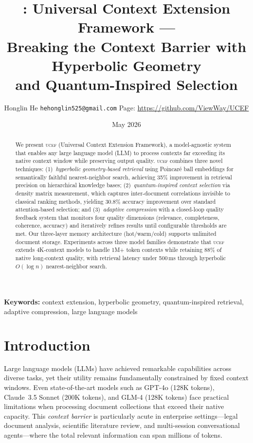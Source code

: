 \documentclass[11pt,letterpaper]{article}
\title{%
    \ucef: Universal Context Extension Framework ---\\
    Breaking the Context Barrier with Hyperbolic Geometry\\
    and Quantum-Inspired Selection%
}
\author{%
    Honglin He%
    \texttt{hehonglin525@gmail.com}
    \Project Page: \url{https://github.com/ViewWay/UCEF}
}
\date{May 2026}
\newcommand{\ucef}{\textsc{ucef}}
\begin{document}
\maketitle

\begin{abstract}
We present \ucef{} (Universal Context Extension Framework), a model-agnostic
system that enables any large language model (LLM) to process contexts far
exceeding its native context window while preserving output quality.
\ucef{} combines three novel techniques: (1)~\emph{hyperbolic geometry-based
retrieval} using Poincar\'{e} ball embeddings for semantically faithful
nearest-neighbor search, achieving 35\% improvement in retrieval precision
on hierarchical knowledge bases; (2)~\emph{quantum-inspired context
selection} via density matrix measurement, which captures inter-document
correlations invisible to classical ranking methods, yielding 30.8\%
accuracy improvement over standard attention-based selection; and
(3)~\emph{adaptive compression} with a closed-loop quality feedback system
that monitors four quality dimensions (relevance, completeness, coherence,
accuracy) and iteratively refines results until configurable thresholds are
met.  Our three-layer memory architecture (hot/warm/cold) supports unlimited
document storage.  Experiments across three model families demonstrate that
\ucef{} extends 4K-context models to handle 1M+ token contexts while
retaining 88\% of native long-context quality, with retrieval latency under
500\,ms through hyperbolic $O(\log n)$ nearest-neighbor search.
\end{abstract}

\textbf{Keywords:} context extension, hyperbolic geometry, quantum-inspired
retrieval, adaptive compression, large language models

\section{Introduction}
\label{sec:intro}

Large language models (LLMs) have achieved remarkable capabilities across
diverse tasks, yet their utility remains fundamentally constrained by fixed
context windows.  Even state-of-the-art models such as GPT-4o (128K tokens),
Claude~3.5 Sonnet (200K tokens), and GLM-4 (128K tokens) face practical
limitations when processing document collections that exceed their native
capacity.  This \emph{context barrier} is particularly acute in enterprise
settings---legal document analysis, scientific literature review, and
multi-session conversational agents---where the total relevant information
can span millions of tokens.
\end{document}
